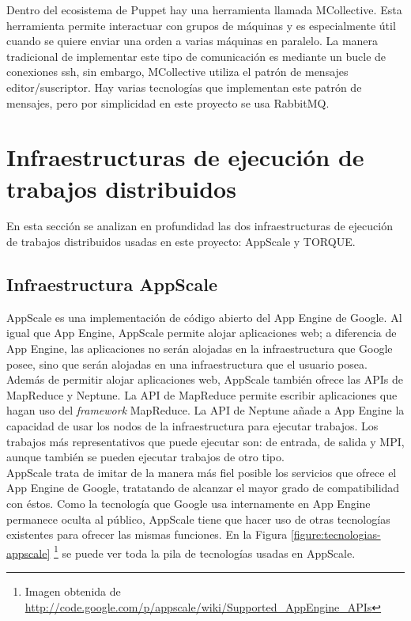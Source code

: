 
Dentro del ecosistema de Puppet hay una herramienta llamada MCollective. Esta herramienta permite interactuar con grupos de máquinas y es especialmente útil cuando se quiere enviar una orden a varias máquinas en paralelo. La manera tradicional de implementar este tipo de comunicación es mediante un bucle de conexiones ssh, sin embargo, MCollective utiliza el patrón de mensajes editor/suscriptor. Hay varias tecnologías que implementan este patrón de mensajes, pero por simplicidad en este proyecto se usa RabbitMQ.


\section{Infraestructuras de ejecución de trabajos distribuidos}

En esta sección se analizan en profundidad las dos infraestructuras de ejecución de trabajos distribuidos usadas en este proyecto: AppScale y TORQUE.


\subsection{Infraestructura AppScale}


AppScale es una implementación de código abierto del App Engine de Google. Al igual que App Engine, AppScale permite alojar aplicaciones web; a diferencia de App Engine, las aplicaciones no serán alojadas en la infraestructura que Google posee, sino que serán alojadas en una infraestructura que el usuario posea. Además de permitir alojar aplicaciones web, AppScale también ofrece las APIs de MapReduce y Neptune. La API de MapReduce permite escribir aplicaciones que hagan uso del \emph{framework} MapReduce. La API de Neptune añade a App Engine la capacidad de usar los nodos de la infraestructura para ejecutar trabajos. Los trabajos más representativos que puede ejecutar son: de entrada, de salida y MPI, aunque también se pueden ejecutar trabajos de otro tipo. \\

AppScale trata de imitar de la manera más fiel posible los servicios que ofrece el App Engine de Google, tratatando de alcanzar el mayor grado de compatibilidad con éstos. Como la tecnología que Google usa internamente en App Engine permanece oculta al público, AppScale tiene que hacer uso de otras tecnologías existentes para ofrecer las mismas funciones. En la Figura \ref{figure:tecnologias-appscale} \footnote[1]{Imagen obtenida de \url{http://code.google.com/p/appscale/wiki/Supported_AppEngine_APIs}} se puede ver toda la pila de tecnologías usadas en AppScale.

